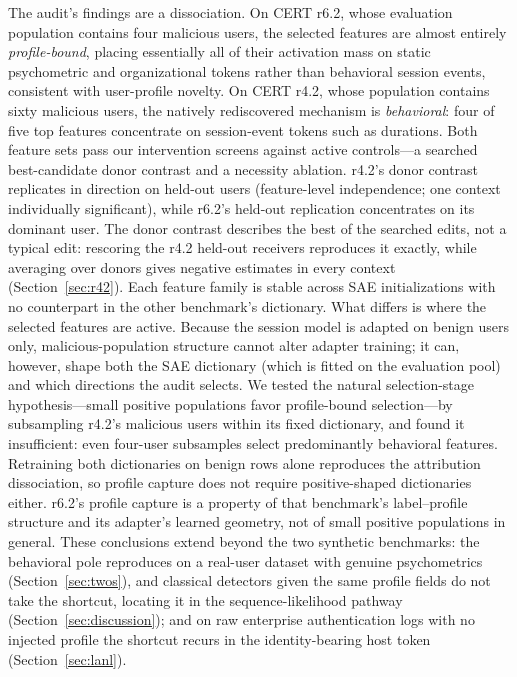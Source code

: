 \documentclass[10pt]{article} %
\newcommand{\rsix}{r6.2}
\newcommand{\rfour}{r4.2}
\begin{document}
The audit's findings are a dissociation. On CERT \rsix{}, whose evaluation
population contains four malicious users, the selected features are
almost entirely \emph{profile-bound}, placing essentially all of their
activation mass on static psychometric and organizational tokens rather than
behavioral session events, consistent with user-profile novelty. On CERT \rfour{}, whose population contains
sixty malicious users, the natively rediscovered mechanism is
\emph{behavioral}: four of five top features concentrate on session-event
tokens such as durations. Both feature sets pass our intervention screens
against active controls---a searched best-candidate donor contrast and a
necessity ablation. \rfour{}'s donor contrast replicates in direction on
held-out users (feature-level independence; one context individually
significant), while \rsix{}'s held-out replication concentrates on its
dominant user. The donor contrast describes the best of the searched edits,
not a typical edit: rescoring the \rfour{} held-out receivers reproduces it
exactly, while averaging over donors gives negative estimates in every context
(Section~\ref{sec:r42}). Each feature family is stable across SAE
initializations with no counterpart in the other benchmark's dictionary. What
differs is where the selected features are active. Because the session model is adapted on benign users only,
malicious-population structure cannot alter adapter training; it can,
however, shape both the SAE dictionary (which is fitted on the evaluation
pool) and which directions the audit selects. We tested the natural
selection-stage hypothesis---small positive populations favor profile-bound
selection---by subsampling \rfour{}'s malicious users within its fixed
dictionary, and found it insufficient: even four-user subsamples select
predominantly behavioral features. Retraining both dictionaries on benign
rows alone reproduces the attribution dissociation, so profile capture does
not require positive-shaped dictionaries either. \rsix{}'s
profile capture is a property of that benchmark's label--profile structure
and its adapter's learned geometry, not of small positive populations in
general. These conclusions extend beyond the two synthetic benchmarks: the
behavioral pole reproduces on a real-user dataset with genuine psychometrics
(Section~\ref{sec:twos}), and classical detectors given the same profile
fields do not take the shortcut, locating it in the sequence-likelihood
pathway (Section~\ref{sec:discussion}); and on raw enterprise authentication
logs with no injected profile the shortcut recurs in the identity-bearing host
token (Section~\ref{sec:lanl}).
\end{document}
